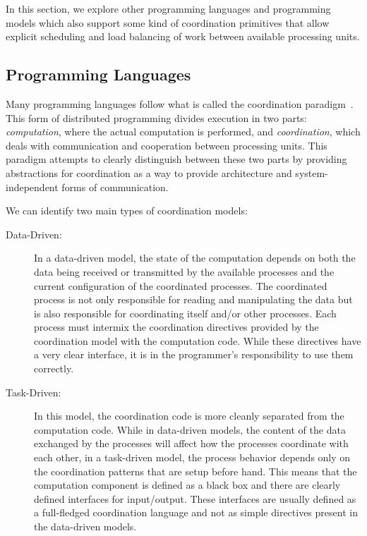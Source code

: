 
In this section, we explore other programming languages and programming models
which also support some kind of coordination primitives that allow explicit
scheduling and load balancing of work between available processing units.

\subsection{Programming Languages}

Many programming languages follow what is called the coordination
paradigm~\cite{Papadopoulos98coordinationmodels}. This form of distributed
programming divides execution in two parts: \emph{computation}, where the actual
computation is performed, and \emph{coordination}, which deals with
communication and cooperation between processing units. This paradigm attempts
to clearly distinguish between these two parts by providing abstractions for
coordination as a way to provide architecture and system-independent forms of
communication.

We can identify two main types of coordination models:

\begin{description}
   \item[Data-Driven:]
   
   In a data-driven model, the state of the computation depends on both the data
   being received or transmitted by the available processes and the current configuration
   of the coordinated processes. The coordinated process is not only responsible
   for reading and manipulating the data but is also responsible for
   coordinating itself and/or other processes. Each process must intermix the
   coordination directives provided by the coordination model with the
   computation code. While these directives have a very clear interface, it is
   in the programmer's responsibility to use them correctly.

   \item[Task-Driven:]
   
   In this model, the coordination code is more cleanly separated from the
   computation code. While in data-driven models, the content of the data
   exchanged by the processes will affect how the processes coordinate with each
   other, in a task-driven model, the process behavior depends only on the
   coordination patterns that are setup before hand. This means that the
   computation component is defined as a black box and there are clearly defined
   interfaces for input/output. These interfaces are usually defined as a
   full-fledged coordination language and not as simple directives present in
   the data-driven models.  \end{description}

